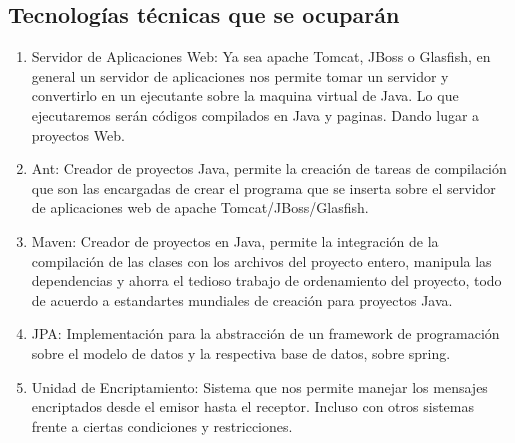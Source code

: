 \documentclass[a4paper,12pt,openany,oneside]{book}
\begin{document}
\subsection{Tecnologías técnicas que se ocuparán}
\begin{enumerate}
\item Servidor de Aplicaciones Web: Ya sea apache Tomcat, JBoss o Glasfish, en general un servidor de aplicaciones nos permite tomar un servidor y convertirlo en un ejecutante sobre la maquina virtual de Java. Lo que ejecutaremos serán códigos compilados en Java y paginas. Dando lugar a proyectos Web.
\item Ant: Creador de proyectos Java, permite la creación de tareas de compilación que son las encargadas de crear el programa que se inserta sobre el servidor de aplicaciones web de apache Tomcat/JBoss/Glasfish.
\item Maven: Creador de proyectos en Java, permite la integración de la compilación de las clases con los archivos del proyecto entero, manipula las dependencias y ahorra el tedioso trabajo de ordenamiento del proyecto, todo de acuerdo a estandartes mundiales de creación para proyectos Java.
\item JPA: Implementación para la abstracción de un framework de programación sobre el modelo de datos y la respectiva base de datos, sobre spring.
\item Unidad de Encriptamiento: Sistema que nos permite manejar los mensajes encriptados desde el emisor hasta el receptor. Incluso con otros sistemas frente a ciertas condiciones y restricciones.
\end{enumerate}
\end{document}
